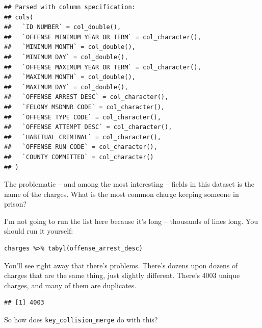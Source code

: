 \documentclass[]{book}
\newenvironment{Shaded}{\begin{snugshade}}{\end{snugshade}}
\newcommand{\DataTypeTok}[1]{\textcolor[rgb]{0.13,0.29,0.53}{#1}}
\newcommand{\KeywordTok}[1]{\textcolor[rgb]{0.13,0.29,0.53}{\textbf{#1}}}
\newcommand{\NormalTok}[1]{#1}
\newcommand{\OperatorTok}[1]{\textcolor[rgb]{0.81,0.36,0.00}{\textbf{#1}}}
\newcommand{\OtherTok}[1]{\textcolor[rgb]{0.56,0.35,0.01}{#1}}
\newcommand{\StringTok}[1]{\textcolor[rgb]{0.31,0.60,0.02}{#1}}
\begin{document}
\begin{verbatim}
## Parsed with column specification:
## cols(
##   `ID NUMBER` = col_double(),
##   `OFFENSE MINIMUM YEAR OR TERM` = col_character(),
##   `MINIMUM MONTH` = col_double(),
##   `MINIMUM DAY` = col_double(),
##   `OFFENSE MAXIMUM YEAR OR TERM` = col_character(),
##   `MAXIMUM MONTH` = col_double(),
##   `MAXIMUM DAY` = col_double(),
##   `OFFENSE ARREST DESC` = col_character(),
##   `FELONY MSDMNR CODE` = col_character(),
##   `OFFENSE TYPE CODE` = col_character(),
##   `OFFENSE ATTEMPT DESC` = col_character(),
##   `HABITUAL CRIMINAL` = col_character(),
##   `OFFENSE RUN CODE` = col_character(),
##   `COUNTY COMMITTED` = col_character()
## )
\end{verbatim}

The problematic -- and among the most interesting -- fields in this dataset is the name of the charges. What is the most common charge keeping someone in prison?

I'm not going to run the list here because it's long -- thousands of lines long. You should run it yourself:

\begin{verbatim}
charges %>% tabyl(offense_arrest_desc)
\end{verbatim}

You'll see right away that there's problems. There's dozens upon dozens of charges that are the same thing, just slightly different. There's 4003 unique charges, and many of them are duplicates.

\begin{Shaded}
\end{Shaded}

\begin{verbatim}
## [1] 4003
\end{verbatim}

So how does \texttt{key\_collision\_merge} do with this?

\begin{Shaded}
\end{Shaded}
\end{document}
